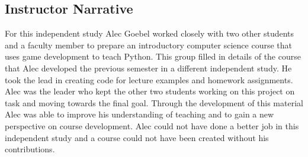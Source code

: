 
\subsection*{Instructor Narrative}
For this independent study Alec Goebel worked closely with two other
students and a faculty member to prepare an introductory computer
science course that uses game development to teach Python. This group
filled in details of the course that Alec developed the previous
semester in a different independent study. He took the lead in creating
code for lecture examples and homework assignments. Alec was the leader
who kept the other two students working on this project on task and
moving towards the final goal. Through the development of this material
Alec was able to improve his understanding of teaching and to gain a new
perspective on course development. Alec could not have done a better
job in this independent study and a course could not have been created
without his contributions.

